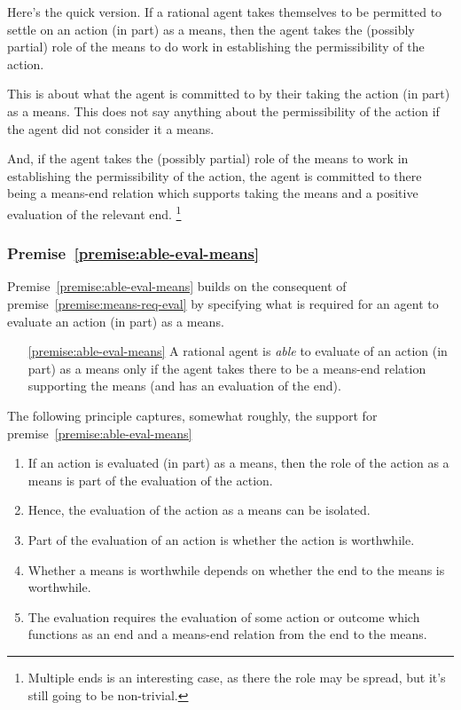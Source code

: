 \documentclass[10pt]{article}
\newcommand{\hozlinedash}[0]{%
  \noindent\hdashrule[0.5ex][c]{\textwidth}{.1pt}{2.5pt}
}
\begin{document}
\hozlinedash

Here's the quick version.
If a rational agent takes themselves to be permitted to settle on an action (in part) as a means, then the agent takes the (possibly partial) role of the means to do work in establishing the permissibility of the action.

This is about what the agent is committed to by their taking the action (in part) as a means.
This does not say anything about the permissibility of the action if the agent did not consider it a means.

And, if the agent takes the (possibly partial) role of the means to work in establishing the permissibility of the action, the agent is committed to there being a means-end relation which supports taking the means and a positive evaluation of the relevant end.\nolinebreak
\footnote{Multiple ends is an interesting case, as there the role may be spread, but it's still going to be non-trivial.}

\newpage


\subsubsection{Premise~\ref{premise:able-eval-means}}

Premise~\ref{premise:able-eval-means} builds on the consequent of premise~\ref{premise:means-req-eval} by specifying what is required for an agent to evaluate an action (in part) as a means.

\begin{enumerate}
\item[\ref{premise:able-eval-means}] A rational agent is \emph{able} to evaluate of an action (in part) as a means only if the agent takes there to be a means-end relation supporting the means (and has an evaluation of the end).
\end{enumerate}

The following principle captures, somewhat roughly, the support for premise~\ref{premise:able-eval-means}

\principleMEdependence*

\begin{enumerate}
\item If an action is evaluated (in part) as a means, then the role of the action as a means is part of the evaluation of the action.
\item Hence, the evaluation of the action as a means can be isolated.
\item Part of the evaluation of an action is whether the action is worthwhile.
\item Whether a means is worthwhile depends on whether the end to the means is worthwhile.
\item The evaluation requires the evaluation of some action or outcome which functions as an end and a means-end relation from the end to the means.
\end{enumerate}
\end{document}
